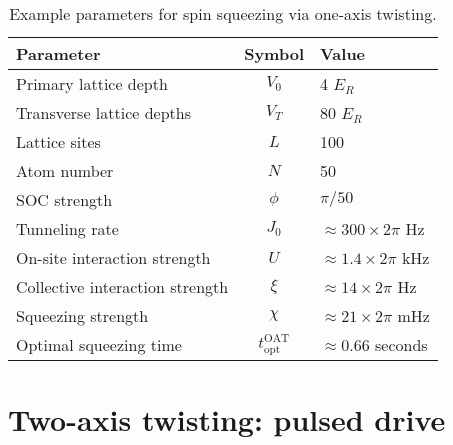 \documentclass[aps,notitlepage,nofootinbib,11pt]{revtex4-1}
\renewcommand{\t}{\text} %
\newcommand{\1}{\hat{\mathds{1}}}
\begin{document}
\begin{table}[h]
  \centering
  \caption{Example parameters for spin squeezing via one-axis
    twisting.}
  \label{tab:parameters}
  \begin{tabular}{|l|c|l|}
    \hline
    Parameter & Symbol & Value \\ \hline\hline
    Primary lattice depth & $V_0$ & 4 $E_R$ \\
    Transverse lattice depths & $V_T$ & 80 $E_R$ \\
    Lattice sites & $L$ & 100 \\
    Atom number & $N$ & 50 \\
    SOC strength & $\phi$ & $\pi/50$ \\ \hline\hline
    Tunneling rate & $J_0$ & $\approx300\times2\pi$ Hz \\
    On-site interaction strength & $U$ & $\approx1.4\times2\pi$ kHz \\
    Collective interaction strength & $\xi$
    & $\approx14\times2\pi$ Hz \\
    Squeezing strength & $\chi$ & $\approx21\times2\pi$ mHz \\
    Optimal squeezing time & $t_{\t{opt}}^{\t{OAT}}$
    & $\approx0.66$ seconds \\ \hline
  \end{tabular}
\end{table}


\section{Two-axis twisting: pulsed drive}
\end{document}
